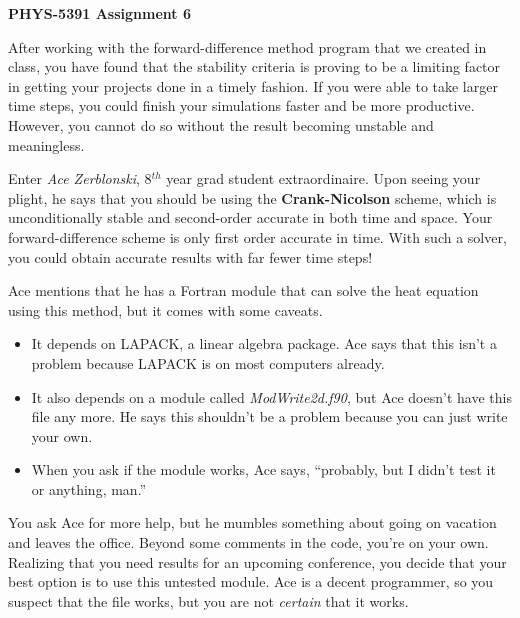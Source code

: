 \documentclass[12pt, letterpaper]{article}
\begin{document}
\begin{center}
  {\LARGE \textbf{PHYS-5391 Assignment 6}}\\
\end{center}

After working with the forward-difference method program that we created
in class, you have found that the stability criteria is proving to be a
limiting factor in getting your projects done in a timely fashion.  If you
were able to take larger time steps, you could finish your simulations faster
and be more productive.  However, you cannot do so without the result
becoming unstable and meaningless.

Enter \emph{Ace Zerblonski}, 8$^{th}$ year grad student extraordinaire.  Upon
seeing your plight, he says that you should be using the 
\textbf{Crank-Nicolson} scheme, which is unconditionally stable and 
second-order accurate in both time and space.  Your forward-difference scheme
is only first order accurate in time.  With such a solver, you could obtain
accurate results with far fewer time steps!

Ace mentions that he has a Fortran module that can solve the heat equation
using this method, but it comes with some caveats.
\begin{itemize}
  \item It depends on LAPACK, a linear algebra package.  Ace says that this
    isn't a problem because LAPACK is on most computers already.
  \item It also depends on a module called \textit{ModWrite2d.f90}, but
    Ace doesn't have this file any more.  He says this shouldn't be a problem
    because you can just write your own.
  \item When you ask if the module works, Ace says, ``probably, but I didn't
    test it or anything, man.''  
\end{itemize}

You ask Ace for more help, but he mumbles something about going on vacation
and leaves the office.  
Beyond some comments in the code, you're on your own.
Realizing that you need results for an upcoming
conference, you decide that your best option is to use this untested 
module.  Ace is a decent programmer, so you suspect that the file works, but
you are not \emph{certain} that it works.  
\end{document}
